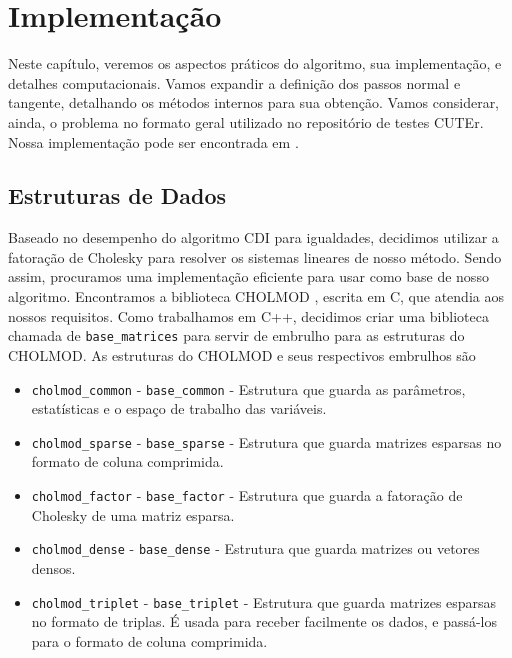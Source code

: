 \chapter{Implementação}

Neste capítulo, veremos os aspectos práticos do algoritmo, sua implementação, e 
detalhes computacionais. Vamos expandir a definição dos passos normal e
tangente,
detalhando os métodos internos para sua obtenção. Vamos considerar, ainda, o problema
no formato geral utilizado no repositório de testes CUTEr\cite{bib:cuter}.
Nossa implementação pode ser encontrada em \cite{bib:dcicpp}.

\section{Estruturas de Dados}

Baseado no desempenho do algoritmo CDI para igualdades, decidimos utilizar a
fatoração de Cholesky para resolver os sistemas lineares de nosso método. Sendo
assim, procuramos uma implementação eficiente para usar como base de nosso
algoritmo. Encontramos a biblioteca CHOLMOD
\cite{bib:cholmod2,bib:cholmod3,bib:cholmod1,bib:cholmod4, bib:cholmod5},
escrita em C, que atendia aos nossos requisitos. Como trabalhamos em C++,
decidimos criar uma biblioteca chamada de \verb+base_matrices+
\cite{bib:base_matrices} para servir de embrulho para as estruturas do CHOLMOD.
As estruturas do CHOLMOD e seus respectivos embrulhos são
\begin{itemize}
 \item \verb+cholmod_common+ - \verb+base_common+ - Estrutura que guarda as
   parâmetros, estatísticas e o espaço de trabalho das variáveis.
 \item \verb+cholmod_sparse+ - \verb+base_sparse+ - Estrutura que guarda
   matrizes esparsas no formato de coluna comprimida.
 \item \verb+cholmod_factor+ - \verb+base_factor+ - Estrutura que guarda a
   fatoração de Cholesky de uma matriz esparsa.
 \item \verb+cholmod_dense+ - \verb+base_dense+ - Estrutura que guarda matrizes
   ou vetores densos.
 \item \verb+cholmod_triplet+ - \verb+base_triplet+ - Estrutura que guarda
   matrizes esparsas no formato de triplas. É usada para receber facilmente os
   dados, e passá-los para o formato de coluna comprimida.
\end{itemize}

